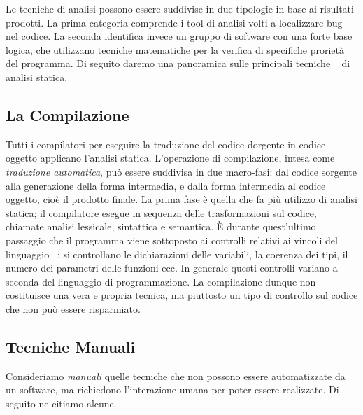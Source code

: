 Le tecniche di analisi possono essere suddivise in due tipologie in base ai risultati prodotti. La prima categoria comprende i tool di analisi volti a localizzare bug nel codice. La seconda identifica invece un gruppo di software con una forte base logica, che utilizzano tecniche matematiche per la verifica di specifiche prorietà del programma.\newline
\indent Di seguito daremo una panoramica sulle principali tecniche ~\cite{analisi-statica-unina} di analisi statica.

    \subsection{La Compilazione}
    

    Tutti i compilatori per eseguire la traduzione del codice dorgente in codice oggetto applicano l'analisi statica. L'operazione di compilazione, intesa come \emph{traduzione automatica}, può essere suddivisa in due macro-fasi: dal codice sorgente alla generazione della forma intermedia, e dalla forma intermedia al codice oggetto, cioè il prodotto finale. La prima fase è quella che fa più utilizzo di analisi statica; il compilatore esegue in sequenza delle trasformazioni sul codice, chiamate analisi lessicale, sintattica e semantica. \`E durante quest'ultimo passaggio che il programma viene sottoposto ai controlli relativi ai vincoli del linguaggio ~\cite{gabbrielli2011linguaggi}: si controllano le dichiarazioni delle variabili, la coerenza dei tipi, il numero dei parametri delle funzioni ecc. 
    In generale questi controlli variano a seconda del linguaggio di programmazione.\newline
    \indent La compilazione dunque non costituisce una vera e propria tecnica, ma piuttosto un tipo di controllo sul codice che non può essere risparmiato.\newline
    
    \subsection{Tecniche Manuali}
    
    Consideriamo \textit{manuali} quelle tecniche che non possono essere automatizzate da un software, ma richiedono l'interazione umana per poter essere realizzate. Di seguito ne citiamo alcune.\newline
    
